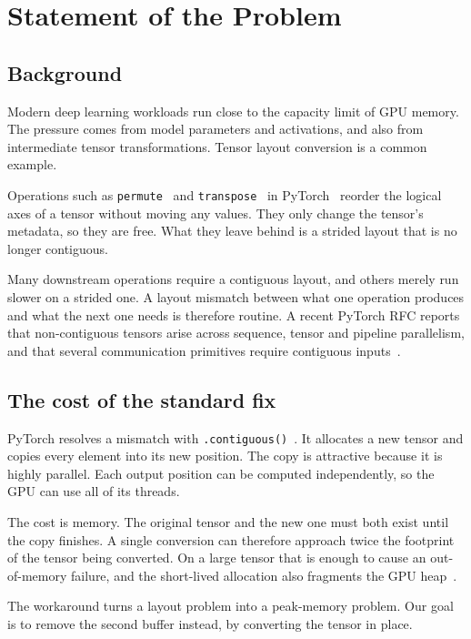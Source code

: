 \section{Statement of the Problem}
\label{sec:problem}

\subsection{Background}

Modern deep learning workloads run close to the capacity limit of GPU memory.
The pressure comes from model parameters and activations, and also from
intermediate tensor transformations. Tensor layout conversion is a common
example.

Operations such as \texttt{permute}~\cite{pytorch_permute_docs} and
\texttt{transpose}~\cite{pytorch_transpose_docs} in
PyTorch~\cite{pytorch_2x} reorder the logical axes of a tensor without moving
any values. They only change the tensor's metadata, so they are free. What
they leave behind is a strided layout that is no longer contiguous.

Many downstream operations require a contiguous layout, and others merely run
slower on a strided one. A layout mismatch between what one operation produces
and what the next one needs is therefore routine. A recent PyTorch RFC reports
that non-contiguous tensors arise across sequence, tensor and pipeline
parallelism, and that several communication primitives require contiguous
inputs~\cite{pytorch_rfc_comms_2026}.

\subsection{The cost of the standard fix}

PyTorch resolves a mismatch with
\texttt{.contiguous()}~\cite{pytorch_contiguous_2016}. It allocates a new
tensor and copies every element into its new position. The copy is attractive
because it is highly parallel. Each output position can be computed
independently, so the GPU can use all of its threads.

The cost is memory. The original tensor and the new one must both exist until
the copy finishes. A single conversion can therefore approach twice the
footprint of the tensor being converted. On a large tensor that is enough to
cause an out-of-memory failure, and the short-lived allocation also fragments
the GPU heap~\cite{rajbhandari2020zero,pytorch_rfc_comms_2026}.

The workaround turns a layout problem into a peak-memory problem. Our goal is
to remove the second buffer instead, by converting the tensor in place.

